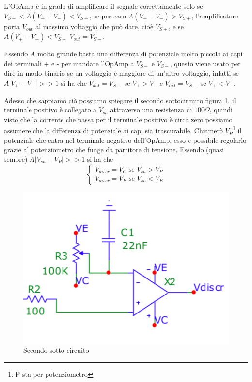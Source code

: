 \documentclass{article}
\begin{document}
	L'OpAmp è in grado di amplificare il segnale correttamente solo se $V_{S-}<A(V_+-V_-)<V_{S+}$, se per caso $A(V_+-V_-)>V_{S+}$, l'amplificatore porta $V_{out}$ al massimo voltaggio che può dare, cioè $V_{S+}$, e se $A(V_+-V_-)<V_{S-}$ $V_{out}=V_{S-}$.\newline
	
	Essendo $A$ molto grande basta una differenza di potenziale molto piccola ai capi dei terminali + e - per mandare l'OpAmp a $V_{S+}$ e $V_{S-}$, questo viene usato per dire in modo binario se un voltaggio è maggiore di un'altro voltaggio, infatti se $A|V_+-V_-|>>1$ si ha che $V_{out}=V_{S+}$ se $V_+>V_-$ e $V_{out}=V_{S-}$ se $V_+<V_-$.\newline
	
	Adesso che sappiamo ciò possiamo spiegare il secondo sottocircuito figura \ref{fig:circ2}, il terminale positivo è collegato a $V_{sh}$ attraverso una resistenza di $100\Omega$, quindi visto che la corrente che passa per il terminale positivo è circa zero possiamo assumere che la differenza di potenziale ai capi sia trascurabile.\newline
	Chiamerò $V_P$\footnote{P sta per potenziometro} il potenziale che entra nel terminale negativo dell'OpAmp, esso è possibile regolarlo grazie al potenziometro che funge da partitore di tensione.\newline
	Essendo (quasi sempre) $A|V_{sh}-V_P|>>1$ si ha che 
	\begin{equation}
	\begin{cases}
	V_{discr}=V_C\textrm{ se } V_{sh}>V_P\\
	V_{discr}=V_E \textrm{ se } V_{sh}<V_E
	\end{cases}
	\end{equation}
	
	\begin{figure}
		\label{fig:circ2}
		\centering
		\includegraphics[width=0.45\linewidth]{immagini/circ1b.png}
		\caption{Secondo sotto-circuito}
	\end{figure}
	
\end{document}
